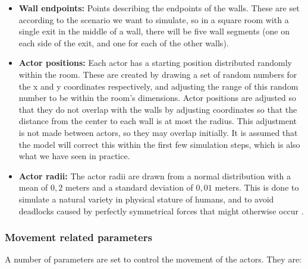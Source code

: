 \begin{itemize}
    \item \textbf{Wall endpoints:} Points describing the endpoints of the 
        walls. These are set according to the scenario we want to simulate, so 
        in a square room with a single exit in the middle of a wall, there 
        will be five wall segments (one on each side of the exit, and one for 
        each of the other walls).

    \item \textbf{Actor positions:} Each actor has a starting position 
        distributed randomly within the room. These are created by drawing a 
        set of random numbers for the x and y coordinates respectively, and 
        adjusting the range of this random number to be within the room's 
        dimensions. Actor positions are adjusted so that they do not overlap 
        with the walls by adjusting coordinates so that the distance from the 
        center to each wall is at most the radius. This adjustment is not made 
        between actors, so they may overlap initially. It is assumed that the 
        model will correct this within the first few simulation steps, which 
        is also what we have seen in practice.

    \item \textbf{Actor radii:} The actor radii are drawn from a normal 
        distribution with a mean of $0,2$ meters and a standard deviation of 
        $0,01$ meters. This is done to simulate a natural variety in physical 
        stature of humans, and to avoid deadlocks caused by perfectly 
        symmetrical forces that might otherwise occur \cite{helbing00}.
\end{itemize}

\subsubsection{Movement related parameters}
A number of parameters are set to control the movement of the actors. They 
are:

